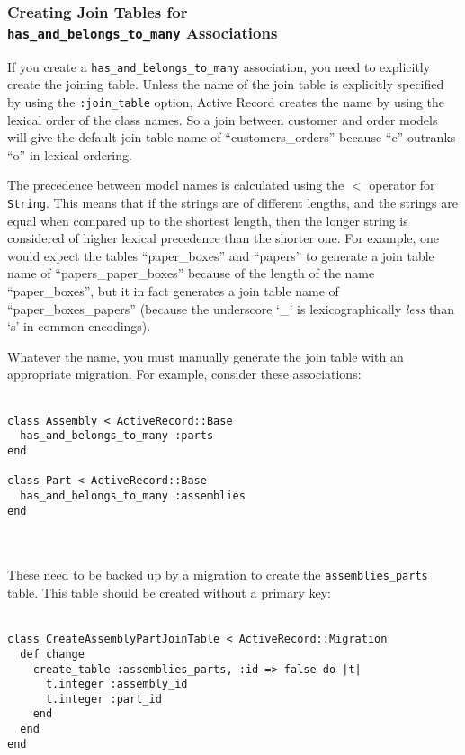 \documentclass[10pt]{book}
\begin{document}
\subsubsection{ Creating Join Tables for \\ \texttt{has\_and\_belongs\_to\_many} Associations}

If you create a \texttt{has\_and\_belongs\_to\_many} association, you  need to explicitly create the joining table. Unless the name of the join  table is explicitly specified by using the \texttt{:join\_table} option,  Active Record creates the name by using the lexical order of the class  names. So a join between customer and order models will give the default  join table name of “customers\_orders” because “c” outranks “o” in  lexical ordering.

The precedence between model names is calculated using the \texttt{$<$} operator for \texttt{String}.  This means that if the strings are of different lengths, and the  strings are equal when compared up to the shortest length, then the  longer string is considered of higher lexical precedence than the  shorter one. For example, one would expect the tables “paper\_boxes” and  “papers” to generate a join table name of “papers\_paper\_boxes” because  of the length of the name “paper\_boxes”, but it in fact generates a join  table name of “paper\_boxes\_papers” (because the underscore ‘\_’ is  lexicographically \emph{less} than ‘s’ in common encodings).

Whatever the name, you must manually generate the join table with an  appropriate migration. For example, consider these associations:
\\ \\
\begin{minipage}{\textwidth}{\scriptsize
\begin{verbatim}
class Assembly < ActiveRecord::Base
  has_and_belongs_to_many :parts
end
 
class Part < ActiveRecord::Base
  has_and_belongs_to_many :assemblies
end
\end{verbatim}}
\end{minipage}
\\ \\

These need to be backed up by a migration to create the \texttt{assemblies\_parts} table. This table should be created without a primary key:
\\ \\
\begin{minipage}{\textwidth}{\scriptsize
\begin{verbatim}
class CreateAssemblyPartJoinTable < ActiveRecord::Migration
  def change
    create_table :assemblies_parts, :id => false do |t|
      t.integer :assembly_id
      t.integer :part_id
    end
  end
end
\end{verbatim}}
\end{minipage}
\\ \\
\end{document}
